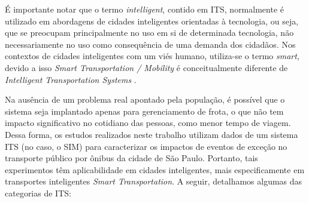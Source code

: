 \documentclass[
	12pt,				%
	oneside,			%
	a4paper,			%
	english,			%
	brazil				%
	]{abntex2ppgsi}
\begin{document}
{É importante notar que o termo \textit{intelligent}, contido em ITS, normalmente é utilizado em abordagens de cidades inteligentes orientadas à tecnologia, ou seja, que se preocupam principalmente no uso em si de determinada tecnologia, não necessariamente no uso como consequência de uma demanda dos cidadãos. Nos contextos de cidades inteligentes com um viés humano, utiliza-se o termo \textit{smart}, devido a isso \textit{Smart Transportation / Mobility} é conceitualmente diferente de \textit{Intelligent Transportation Systems} \cite{albino2015smart}. 

Na ausência de um problema real apontado pela população, é possível que o sistema seja implantado apenas para gerenciamento de frota, o que não tem impacto significativo no cotidiano das pessoas, como menor tempo de viagem. Dessa forma, os estudos realizados neste trabalho utilizam dados de um sistema ITS (no caso, o SIM) para caracterizar os impactos de eventos de exceção no transporte público por ônibus da cidade de São Paulo. Portanto, tais experimentos têm aplicabilidade em cidades inteligentes, mais especificamente em transportes inteligentes \textit{Smart Transportation}. A seguir, detalhamos algumas das categorias de ITS:

}
\end{document}
